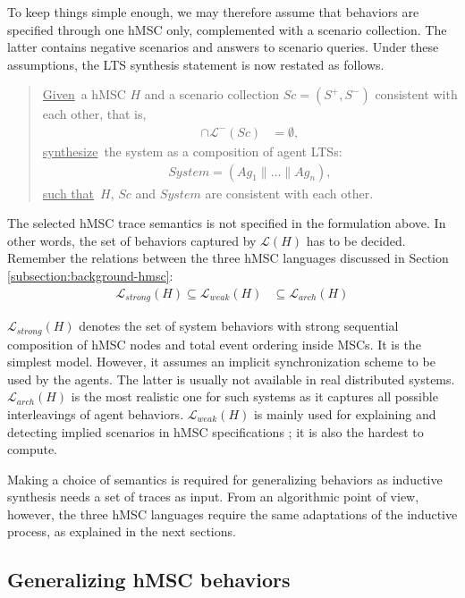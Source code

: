 To keep things simple enough, we may therefore assume that behaviors are specified through one hMSC only, complemented with a scenario collection. The latter contains negative scenarios and answers to scenario queries. Under these assumptions, the LTS synthesis statement is now restated as follows.

\begin{quote}
\underline{Given}~a hMSC $H$ and a scenario collection $Sc = (S^+,S^-)$ consistent with each other, that is,
\begin{align*}
[\mathcal{L}^+(Sc) \cup \mathcal{L}(H)] \cap \mathcal{L}^-(Sc) &= \emptyset,
\end{align*}
\underline{synthesize}~the system as a composition of agent LTSs:
\begin{align*}
System = (Ag_1 \parallel \ldots \parallel Ag_n),
\end{align*}
\underline{such that}~$H$, $Sc$ and $System$ are consistent with each other.
\end{quote}

The selected hMSC trace semantics is not specified in the formulation above. In other words, the set of behaviors captured by $\mathcal{L}(H)$ has to be decided. Remember the relations between the three hMSC languages discussed in Section \ref{subsection:background-hmsc}: 
\begin{align}
\mathcal{L}_{strong}(H) \subseteq \mathcal{L}_{weak}(H) &\subseteq \mathcal{L}_{arch}(H)
\end{align}

$\mathcal{L}_{strong}(H)$ denotes the set of system behaviors with strong sequential composition of hMSC nodes and total event ordering inside MSCs. It is the simplest model. However, it assumes an implicit synchronization scheme to be used by the agents. The latter is usually not available in real distributed systems. $\mathcal{L}_{arch}(H)$ is the most realistic one for such systems as it captures all possible interleavings of agent behaviors. $\mathcal{L}_{weak}(H)$ is mainly used for explaining and detecting implied scenarios in hMSC specifications \cite{Uchitel:2003}; it is also the hardest to compute.

Making a choice of semantics is required for generalizing behaviors as inductive synthesis needs a set of traces as input. From an algorithmic point of view, however, the three hMSC languages require the same adaptations of the inductive process, as explained in the next sections.

\subsection{Generalizing hMSC behaviors\label{subsection:hmsc-induction-algo-adaptation}}

